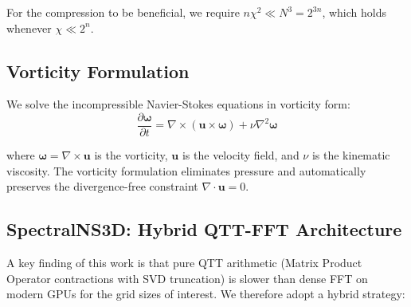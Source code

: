 \documentclass[preprint,12pt,authoryear]{elsarticle}
\theoremstyle{definition}
\begin{document}
For the compression to be beneficial, we require $n\chi^2 \ll N^3 = 2^{3n}$, which holds whenever $\chi \ll 2^{n}$.

\subsection{Vorticity Formulation}

We solve the incompressible Navier-Stokes equations in vorticity form:
\begin{equation}
\frac{\partial \boldsymbol{\omega}}{\partial t} = \nabla \times (\mathbf{u} \times \boldsymbol{\omega}) + \nu \nabla^2 \boldsymbol{\omega}
\label{eq:vorticity}
\end{equation}

where $\boldsymbol{\omega} = \nabla \times \mathbf{u}$ is the vorticity, $\mathbf{u}$ is the velocity field, and $\nu$ is the kinematic viscosity.
The vorticity formulation eliminates pressure and automatically preserves the divergence-free constraint $\nabla \cdot \mathbf{u} = 0$.

\subsection{SpectralNS3D: Hybrid QTT-FFT Architecture}

A key finding of this work is that pure QTT arithmetic (Matrix Product Operator contractions with SVD truncation) is slower than dense FFT on modern GPUs for the grid sizes of interest.
We therefore adopt a hybrid strategy:
\end{document}

